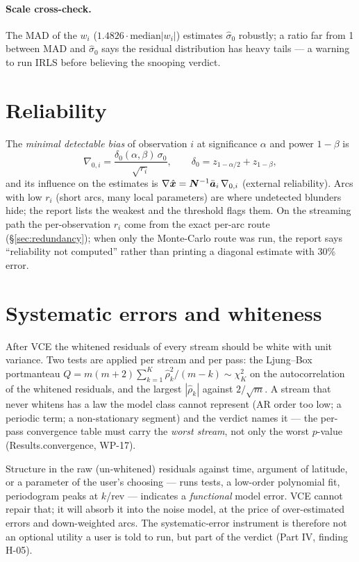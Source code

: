 \paragraph{Scale cross-check.} The MAD of the $w_i$ ($1.4826\cdot\mathrm{median}|w_i|$) estimates $\hat\sigma_0$ robustly; a ratio far from 1 between MAD and $\hat\sigma_0$ says the residual distribution has heavy tails --- a warning to run IRLS before believing the snooping verdict.

\section{Reliability}
\label{sec:reliability}

The \emph{minimal detectable bias} of observation $i$ at significance $\alpha$ and power $1-\beta$ is
\begin{equation}
\nabla_{0,i} = \frac{\delta_0(\alpha,\beta)\,\sigma_0}{\sqrt{r_i}}, \qquad \delta_0 = z_{1-\alpha/2} + z_{1-\beta},
\end{equation}
and its influence on the estimates is $\nabla\hat{\bm{x}} = \bm{N}^{-1}\bar{\bm{a}}_i\,\nabla_{0,i}$ (external reliability). Arcs with low $r_i$ (short arcs, many local parameters) are where undetected blunders hide; the report lists the weakest and the  threshold flags them. On the streaming path the per-observation $r_i$ come from the exact per-arc route (\S\ref{sec:redundancy}); when only the Monte-Carlo route was run, the report says ``reliability not computed'' rather than printing a diagonal estimate with 30\% error.

\section{Systematic errors and whiteness}
\label{sec:systematic}

After VCE the whitened residuals of every stream should be white with unit variance. Two tests are applied per stream and per pass: the Ljung--Box portmanteau $Q = m(m+2)\sum_{k=1}^K \hat\rho_k^2/(m-k) \sim \chi^2_K$ on the autocorrelation of the whitened residuals, and the largest $|\hat\rho_k|$ against $2/\sqrt m$. A stream that never whitens has a law the model class cannot represent (AR order too low; a periodic term; a non-stationary segment) and the verdict names it --- the per-pass convergence table must carry the \emph{worst stream}, not only the worst $p$-value (Results.convergence, WP-17).

Structure in the raw (un-whitened) residuals against time, argument of latitude, or a parameter of the user's choosing --- runs tests, a low-order polynomial fit, periodogram peaks at $k$/rev --- indicates a \emph{functional} model error. VCE cannot repair that; it will absorb it into the noise model, at the price of over-estimated errors and down-weighted arcs. The systematic-error instrument is therefore not an optional utility a user is told to run, but part of the verdict (Part IV, finding H-05).


